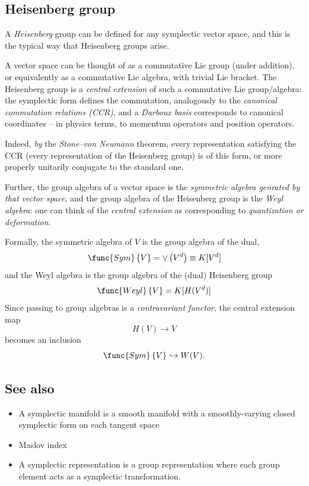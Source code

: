 \documentclass{conm-p-l}
\theoremstyle{definition}
\theoremstyle{remark}
\numberwithin{equation}{section}
\theoremstyle{plain}
\begin{document}
\subsection{Heisenberg group}

A \emph{Heisenberg }group can be defined for any symplectic vector space,
and this is the typical way that Heisenberg groups arise.

A vector space can be thought of as a commutative Lie group (under
addition), or equivalently as a commutative Lie algebra, with trivial Lie
bracket. The Heisenberg group is a \emph{central extension} of such a
commutative Lie group/algebra: the symplectic form defines the commutation,
analogously to the \emph{canonical commutation relations (CCR)}, and a \emph{%
Darboux basis} corresponds to canonical coordinates -- in physics terms, to
momentum operators and position operators.

Indeed, \emph{by} the \emph{Stone--von Neumann} theorem, every
representation satisfying the CCR (every representation of the Heisenberg
group) is of this form, or more properly unitarily conjugate to the standard
one.

Further, the group algebra of a vector space is the \emph{symmetric algebra
genrated by that vector space}, and the group algebra of the Heisenberg
group is the \emph{Weyl algebra}: one can think of the \emph{central
extension} as corresponding to \emph{quantization or deformation}.

Formally, the symmetric algebra of $V$ is the group algebra of the dual, 
\begin{equation}
\func{Sym}\left\{ V\right\} =\vee \left( V^{d}\right) \equiv K[V^{d}]
\end{equation}%
and the Weyl algebra is the group algebra of the (dual) Heisenberg group 
\begin{equation}
\func{Weyl}\left\{ V\right\} =K[H(V^{d})]
\end{equation}%
Since passing to group algebras is a \emph{contravariant functor}, the
central extension map 
\begin{equation}
H(V)\rightarrow V
\end{equation}
becomes an inclusion%
\begin{equation}
\func{Sym}\left\{ V\right\} \hookrightarrow W(V).
\end{equation}

\subsection{See also}

\begin{itemize}
\item  A symplectic manifold is a smooth manifold with a smoothly-varying
closed symplectic form on each tangent space

\item  Maslov index

\item A symplectic representation is a group representation where each group
element acts as a symplectic transformation.
\end{itemize}
\end{document}
